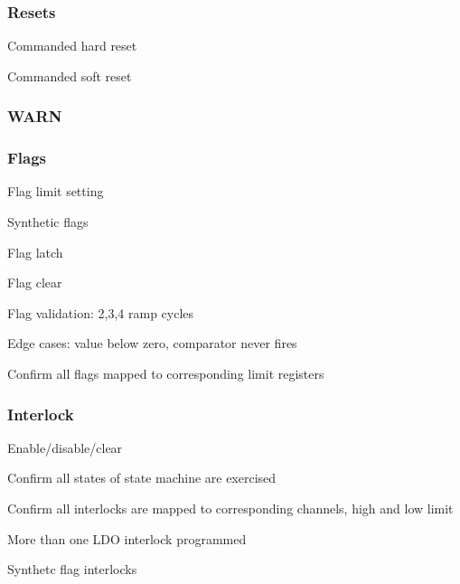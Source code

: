 \documentclass[11pt]{article}   			%
\begin{document}
\subsubsection{Resets}
\begin{compactitem}
    \item{Commanded hard reset}
    \item{Commanded soft reset}
\end{compactitem}

\subsubsection{WARN}

\subsubsection{Flags}
\begin{compactitem}
    \item{Flag limit setting}
    \item{Synthetic flags}
    \item{Flag latch}
    \item{Flag clear}
    \item{Flag validation: 2,3,4 ramp cycles}
    \item{Edge cases: value below zero, comparator never fires}
    \item{Confirm all flags mapped to corresponding limit registers}
\end{compactitem}

\subsubsection{Interlock}
\begin{compactitem}
    \item{Enable/disable/clear}
    \item{Confirm all states of state machine are exercised}
    \item{Confirm all interlocks are mapped to corresponding channels, high and low limit}
	\item{More than one LDO interlock programmed}
	\item{Synthetc flag interlocks}
\end{compactitem}
 
\end{document}
